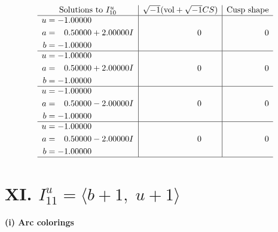 \documentclass[1p]{elsarticle_modified}
\theoremstyle{definition}
\newcommand{\I}{\sqrt{-1}}
\begin{document}
$$\begin{array}{c|c|c}  
\text{Solutions to }I^u_{10}& \I (\text{vol} + \sqrt{-1}CS) & \text{Cusp shape}\\
 \hline 
\begin{aligned}
u &= -1.00000\phantom{ +0.000000I} \\
a &= \phantom{-}0.50000 + 2.00000 I \\
b &= -1.00000\phantom{ +0.000000I}\end{aligned}
 & \phantom{-0.000000 } 0 & \phantom{-0.000000 } 0 \\ \hline\begin{aligned}
u &= -1.00000\phantom{ +0.000000I} \\
a &= \phantom{-}0.50000 + 2.00000 I \\
b &= -1.00000\phantom{ +0.000000I}\end{aligned}
 & \phantom{-0.000000 } 0 & \phantom{-0.000000 } 0 \\ \hline\begin{aligned}
u &= -1.00000\phantom{ +0.000000I} \\
a &= \phantom{-}0.50000 - 2.00000 I \\
b &= -1.00000\phantom{ +0.000000I}\end{aligned}
 & \phantom{-0.000000 } 0 & \phantom{-0.000000 } 0 \\ \hline\begin{aligned}
u &= -1.00000\phantom{ +0.000000I} \\
a &= \phantom{-}0.50000 - 2.00000 I \\
b &= -1.00000\phantom{ +0.000000I}\end{aligned}
 & \phantom{-0.000000 } 0 & \phantom{-0.000000 } 0\\
 \hline 
 \end{array}$$\newpage\newpage\renewcommand{\arraystretch}{1}
\centering \section*{XI. $I^u_{11}= \langle b+1,\;u+1 \rangle$}
\flushleft \textbf{(i) Arc colorings}\\
\end{document}
